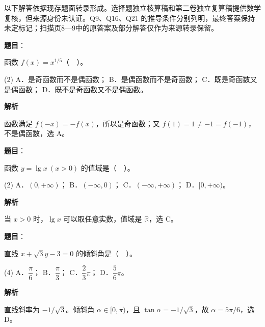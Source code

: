

\begin{gktip}
以下解答依据现存题面转录形成。选择题独立核算稿和第二卷独立复算稿提供数学复核，但来源身份未认证。Q9、Q16、Q21 的推导条件分别列明，最终答案保持未定标记；扫描页8—9中的原答案及部分解答仅作为来源转录保留。
\end{gktip}

\begin{answer}

\textbf{题目}：

函数 $f(x)=x^{1/5}$（　）。

\begin{gkopts}(2)
\task A．是奇函数而不是偶函数；
\task B．是偶函数而不是奇函数；
\task C．既是奇函数又是偶函数；
\task D．既不是奇函数又不是偶函数。
\end{gkopts}

\textbf{解析}

函数满足 $f(-x)=-f(x)$，所以是奇函数；又 $f(1)=1\ne-1=f(-1)$，不是偶函数，选 A。


\end{answer}
\begin{answer}

\textbf{题目}：

函数 $y=\lg x\ (x>0)$ 的值域是（　）。

\begin{gkopts}(2)
\task A．$(0,+\infty)$；
\task B．$(-\infty,0)$；
\task C．$(-\infty,+\infty)$；
\task D．$[0,+\infty)$。
\end{gkopts}

\textbf{解析}

当 $x>0$ 时，$\lg x$ 可以取任意实数，值域是 $\mathbb R$，选 C。


\end{answer}
\begin{answer}

\textbf{题目}：

直线 $x+\sqrt3y-3=0$ 的倾斜角是（　）。

\begin{gkopts}(4)
\task A．$\dfrac\pi6$；
\task B．$\dfrac\pi3$；
\task C．$\dfrac23\pi$；
\task D．$\dfrac56\pi$。
\end{gkopts}

\textbf{解析}

直线斜率为 $-1/\sqrt3$。倾斜角 $\alpha\in[0,\pi)$，且 $\tan\alpha=-1/\sqrt3$，故 $\alpha=5\pi/6$，选 D。


\end{answer}
